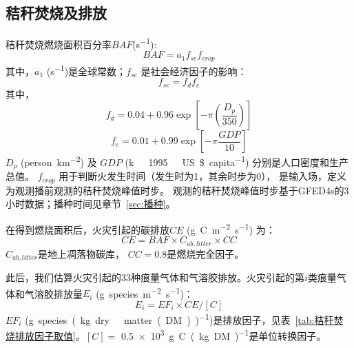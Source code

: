 \subsection{秸秆焚烧及排放}
秸秆焚烧燃烧面积百分率$BAF$(\unit{s^{-1}}):
\begin{equation}
    BAF= a_1 f_{se} f_{crop}
\end{equation}
其中，$a_1$ (\unit{s^{-1}})是全球常数；$f_{se}$ 是社会经济因子的影响：
\begin{equation}
    f_{se} = f_d f_e
\end{equation}
其中，
\begin{equation}
    f_d = 0.04 + 0.96\exp\left[-\pi\left(\frac{D_p}{350}\right)\right]
\end{equation}
\begin{equation}
    f_e = 0.01 + 0.99\exp\left[-\pi\frac{GDP}{10}\right]
\end{equation}
$D_p$ (\unit{person.km^{-2}}) 及 $GDP$ (\unit{k\ 1995\ US\$.capita^{-1}})
分别是人口密度和生产总值。
$f_{crop}$ 用于判断火发生时间（发生时为1，其余时步为0），
是输入场，定义为观测播前观测的秸秆焚烧峰值时步。
观测的秸秆焚烧峰值时步基于GFED4s的3小时数据；播种时间见章节~\ref{sec:播种}。

在得到燃烧面积后，火灾引起的碳排放$CE$ (\unit{g.C.m^{-2}.s^{-1}}) 为：
\begin{equation}
CE=BAF \times C_{ab,litter} \times CC
\end{equation}
$C_{ab,litter}$是地上凋落物碳库， $CC=0.8$是燃烧完全因子。

此后，我们估算火灾引起的33种痕量气体和气溶胶排放。火灾引起的第$i$类痕量气体和气溶胶排放量$E_i$ (\unit{g.species.m^{-2}.s^{-1}})：
\begin{equation}
E_{i}=EF_{i} \times CE /[{C}]
\end{equation}
$EF_i$ (\unit{g.species.(kg.dry\ matter(DM))^{-1}})是排放因子，见表~\ref{tab:秸秆焚烧排放因子取值}。$[C]=$ \qty{0.5e3}{g.C.(kg.DM)^{-1}}是单位转换因子。


